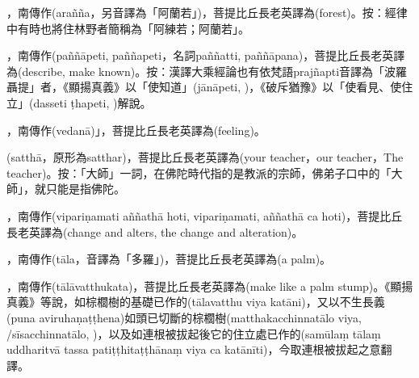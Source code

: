 \startitemgroup[noteitems]
\item{}，南傳作(arañña，另音譯為「阿蘭若」)，菩提比丘長老英譯為(forest)。按：經律中有時也將住林野者簡稱為「阿練若；阿蘭若」。
\stopitemgroup

\startitemgroup[noteitems]
\item{}，南傳作(paññāpeti, paññapeti，名詞paññatti, paññāpana)，菩提比丘長老英譯為(describe, make known)。按：漢譯大乘經論也有依梵語prajñapti音譯為「波羅聶提」者，《顯揚真義》以「使知道」(jānāpeti, )，《破斥猶豫》以「使看見、使住立」(dasseti ṭhapeti, )解說。
\stopitemgroup

\startitemgroup[noteitems]
\item{}，南傳作(vedanā)」，菩提比丘長老英譯為(feeling)。
\stopitemgroup

\startitemgroup[noteitems]
\item{}(satthā，原形為satthar)，菩提比丘長老英譯為(your teacher，our teacher，The teacher)。按：「大師」一詞，在佛陀時代指的是教派的宗師，佛弟子口中的「大師」，就只能是指佛陀。
\stopitemgroup

\startitemgroup[noteitems]
\item{}，南傳作(vipariṇamati aññathā hoti, vipariṇamati, aññathā ca hoti)，菩提比丘長老英譯為(change and alters, the change and alteration)。
\stopitemgroup

\startitemgroup[noteitems]
\item{}，南傳作(tāla，音譯為「多羅」)，菩提比丘長老英譯為(a palm)。
\item{}，南傳作(tālāvatthukata)，菩提比丘長老英譯為(make like a palm stump)。《顯揚真義》等說，如棕櫚樹的基礎已作的(tālavatthu viya katāni)，又以不生長義(puna aviruhaṇaṭṭhena)如頭已切斷的棕櫚樹(matthakacchinnatālo viya, /sīsacchinnatālo, )，以及如連根被拔起後它的住立處已作的(samūlaṃ tālaṃ uddharitvā tassa patiṭṭhitaṭṭhānaṃ viya ca katānīti)，今取連根被拔起之意翻譯。
\stopitemgroup

